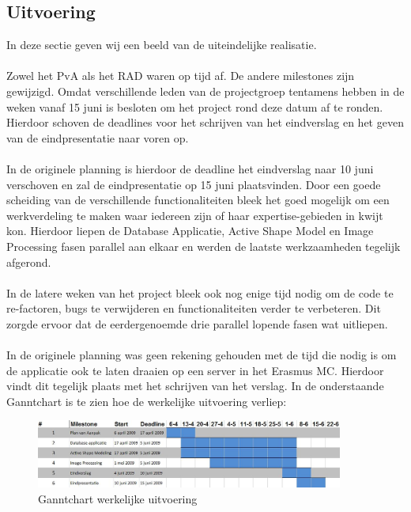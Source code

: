 \subsection{Uitvoering}
\label{werkelijke_planning}
In deze sectie geven wij een beeld van de uiteindelijke realisatie.
\\
\\
Zowel het PvA als het RAD waren op tijd af. De andere milestones zijn
gewijzigd. Omdat verschillende leden van de projectgroep tentamens
hebben in de weken vanaf 15 juni is besloten om het project rond deze datum af
te ronden. Hierdoor schoven de deadlines voor het schrijven van het eindverslag
en het geven van de eindpresentatie naar voren op.
\\
\\
In de originele planning is hierdoor de deadline het eindverslag naar 10 juni verschoven en zal de eindpresentatie op 15 juni plaatsvinden.
Door een goede scheiding van de verschillende functionaliteiten bleek het goed mogelijk om een werkverdeling te maken waar iedereen zijn of haar expertise-gebieden in kwijt kon.
Hierdoor liepen de Database Applicatie, Active Shape Model en Image Processing fasen parallel aan elkaar en werden de laatste werkzaamheden tegelijk afgerond.
\\
\\
In de latere weken van het project bleek ook nog enige tijd nodig om de code te
re-factoren, bugs te verwijderen en functionaliteiten verder te verbeteren. Dit
zorgde ervoor dat de eerdergenoemde drie parallel lopende fasen wat uitliepen.
\\
\\
In de originele planning was geen rekening gehouden met de tijd die nodig is om
de applicatie ook te laten draaien op een server in het Erasmus MC. Hierdoor
vindt dit tegelijk plaats met het schrijven van het verslag.
In de onderstaande Ganntchart is te zien hoe de werkelijke uitvoering verliep:
\\
\begin{figure}[ht]
\includegraphics[width=0.9\textwidth]{ganntafter}
\caption{Ganntchart werkelijke uitvoering}
\label{fig:ganntafter}
\end{figure}

